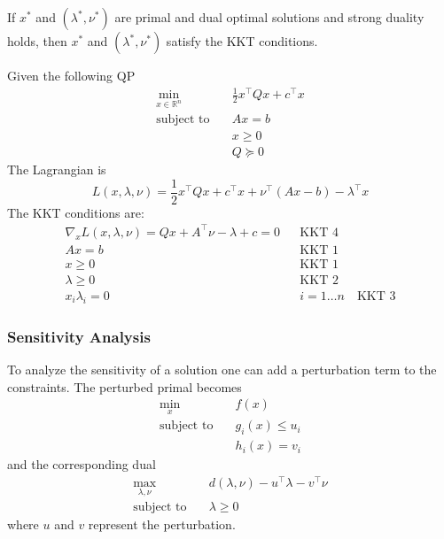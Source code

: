 If $x^*$ and $(\lambda^*,\nu^*)$ are primal and dual optimal solutions and strong duality holds, then $x^*$ and $(\lambda^*,\nu^*)$ satisfy the KKT conditions.

\begin{examplesection}
    Given the following QP
    \begin{align*}
        \min_{x\in\mathbb{R}^n} & \frac{1}{2}x^\top Qx + c^\top x \\
        \text{subject to}\quad  & Ax=b                            \\
                                & x\geq 0                         \\
                                & Q \succeq 0
    \end{align*}
    The Lagrangian is
    \begin{equation*}
        L(x,\lambda,\nu) = \frac{1}{2}x^\top Qx +c^\top x +\nu^\top(Ax-b) -\lambda^\top x
    \end{equation*}
    The KKT conditions are:
    \begin{align*}
        \nabla_x L(x,\lambda,\nu) = Qx + A^\top \nu -\lambda +c = 0 &  & \text{KKT 4}                  \\
        Ax=b                                                        &  & \text{KKT 1}                  \\
        x\geq 0                                                     &  & \text{KKT 1}                  \\
        \lambda \geq 0                                              &  & \text{KKT 2}                  \\
        x_i\lambda_i = 0                                            &  & i=1\ldots n \quad\text{KKT 3}
    \end{align*}
\end{examplesection}

\subsubsection{Sensitivity Analysis}

To analyze the sensitivity of a solution one can add a perturbation term to the constraints. The perturbed primal becomes
\begin{align*}
    \min_{x} \quad         & f(x)            \\
    \text{subject to}\quad & g_i(x) \leq u_i \\
                           & h_i(x) = v_i
\end{align*}
and the corresponding dual
\begin{align*}
    \max_{\lambda,\nu}\quad & d(\lambda,\nu) - u^\top \lambda - v^\top \nu \\
    \text{subject to}\quad  & \lambda \geq 0
\end{align*}
where $u$ and $v$ represent the perturbation.

